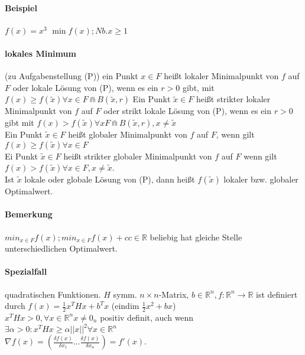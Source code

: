 \documentclass[ngerman,halfparskip]{scrartcl}
\theoremstyle{definition}
\newcommand*{\R}{\mathbb{R}}      %
\begin{document}
\paragraph[1.1.3]{Beispiel}
$f(x)=x^3$ $\min f(x); Nb. x\geq 1$
\paragraph[Def 1.1.4]{lokales Minimum} (zu Aufgabenstellung (P)) ein Punkt $x\in F$ heißt lokaler Minimalpunkt von $f$ auf $F$ oder lokale Lösung von (P), wenn es ein $r>0$ gibt, mit $f(x)\geq f(\tilde x)\forall x\in F \Cap B(\tilde x,r)$ Ein Punkt $\tilde x\in F$ heißt strikter lokaler Minimalpunkt von $f$ auf $F$ oder strikt lokale Lösung von (P), wenn es ein $r>0$ gibt mit $f(x)>f(\tilde x)\forall x F\Cap B(\tilde x,r), x\neq \tilde x$ \\
Ein Punkt $\tilde{x} \in F$ heißt globaler Minimalpunkt von $f$ auf $F$, wenn gilt $f(x)\geq f(\tilde{x})\forall x\in F$\\
Ei Punkt $ \tilde x \in F$ heißt strikter globaler Minimalpunkt von $f$ auf $F$ wenn gilt $ f(x) >f(\tilde x) \forall x\in F, x\neq \tilde x$.\\
Ist $\tilde x$ lokale oder globale Lösung von (P), dann heißt $f(\tilde x)$ lokaler bzw. globaler Optimalwert.
\paragraph*{Bemerkung} $min_{x\in F} f(x); min_{x\in F} f(x)+c c\in\R$ beliebig hat gleiche Stelle unterschiedlichen Optimalwert.
\paragraph*{Spezialfall} quadratischen Funktionen. $H$ symm. $n\times n$-Matrix, $b\in\R^n, f\colon  \R^n\rightarrow \R$ ist definiert durch $f(x)=\frac 12 x^THx+b^Tx$ (eindim $\frac 12 x^2 +bx$)\\
$x^THx>0, \forall x\in \R^n x\neq 0_n$ positiv definit, auch wenn $\exists\alpha >0\colon  x^THx \geq \alpha ||x||^2\forall x\in\R^n$\\
$\nabla f(x)=(\frac{\delta f(x)}{\delta x_1} \ldots \frac{\delta f(x)}{\delta x_n})=f'(x)$.
\end{document}
